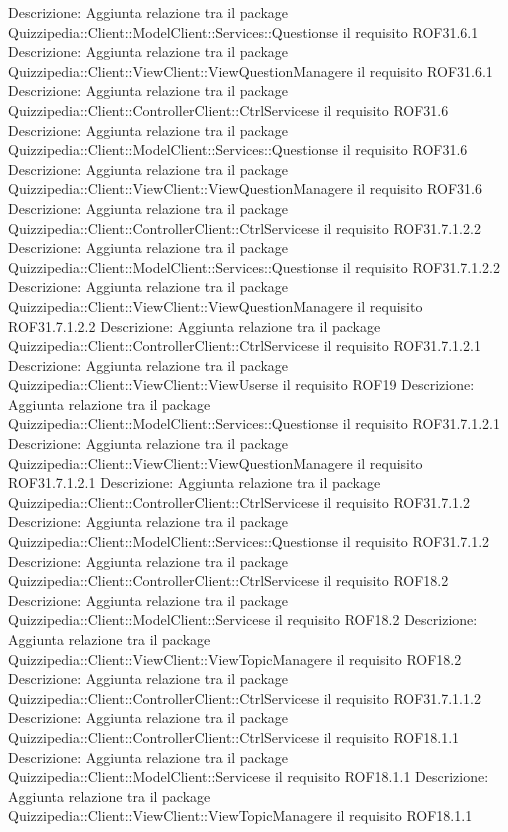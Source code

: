 Descrizione: Aggiunta relazione tra il package Quizzipedia::Client::ModelClient::Services::Questionse il requisito ROF31.6.1 
Descrizione: Aggiunta relazione tra il package Quizzipedia::Client::ViewClient::ViewQuestionManagere il requisito ROF31.6.1 
Descrizione: Aggiunta relazione tra il package Quizzipedia::Client::ControllerClient::CtrlServicese il requisito ROF31.6 
Descrizione: Aggiunta relazione tra il package Quizzipedia::Client::ModelClient::Services::Questionse il requisito ROF31.6 
Descrizione: Aggiunta relazione tra il package Quizzipedia::Client::ViewClient::ViewQuestionManagere il requisito ROF31.6 
Descrizione: Aggiunta relazione tra il package Quizzipedia::Client::ControllerClient::CtrlServicese il requisito ROF31.7.1.2.2 
Descrizione: Aggiunta relazione tra il package Quizzipedia::Client::ModelClient::Services::Questionse il requisito ROF31.7.1.2.2 
Descrizione: Aggiunta relazione tra il package Quizzipedia::Client::ViewClient::ViewQuestionManagere il requisito ROF31.7.1.2.2 
Descrizione: Aggiunta relazione tra il package Quizzipedia::Client::ControllerClient::CtrlServicese il requisito ROF31.7.1.2.1 
Descrizione: Aggiunta relazione tra il package Quizzipedia::Client::ViewClient::ViewUserse il requisito ROF19 
Descrizione: Aggiunta relazione tra il package Quizzipedia::Client::ModelClient::Services::Questionse il requisito ROF31.7.1.2.1 
Descrizione: Aggiunta relazione tra il package Quizzipedia::Client::ViewClient::ViewQuestionManagere il requisito ROF31.7.1.2.1 
Descrizione: Aggiunta relazione tra il package Quizzipedia::Client::ControllerClient::CtrlServicese il requisito ROF31.7.1.2 
Descrizione: Aggiunta relazione tra il package Quizzipedia::Client::ModelClient::Services::Questionse il requisito ROF31.7.1.2 
Descrizione: Aggiunta relazione tra il package Quizzipedia::Client::ControllerClient::CtrlServicese il requisito ROF18.2 
Descrizione: Aggiunta relazione tra il package Quizzipedia::Client::ModelClient::Servicese il requisito ROF18.2 
Descrizione: Aggiunta relazione tra il package Quizzipedia::Client::ViewClient::ViewTopicManagere il requisito ROF18.2 
Descrizione: Aggiunta relazione tra il package Quizzipedia::Client::ControllerClient::CtrlServicese il requisito ROF31.7.1.1.2 
Descrizione: Aggiunta relazione tra il package Quizzipedia::Client::ControllerClient::CtrlServicese il requisito ROF18.1.1 
Descrizione: Aggiunta relazione tra il package Quizzipedia::Client::ModelClient::Servicese il requisito ROF18.1.1 
Descrizione: Aggiunta relazione tra il package Quizzipedia::Client::ViewClient::ViewTopicManagere il requisito ROF18.1.1 
